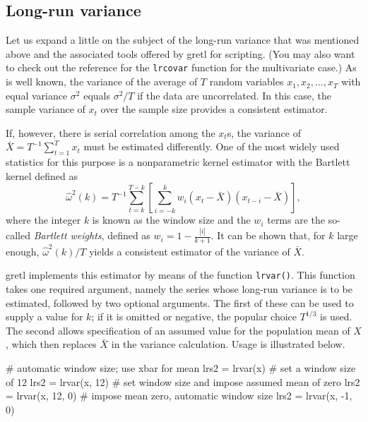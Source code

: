 \subsection{Long-run variance}
\label{sec:lrvar}

Let us expand a little on the subject of the long-run variance that
was mentioned above and the associated tools offered by gretl for
scripting. (You may also want to check out the reference for the
\texttt{lrcovar} function for the multivariate case.)  As is well
known, the variance of the average of $T$ random variables
$x_1, x_2, \ldots, x_T$ with equal variance $\sigma^2$ equals
$\sigma^2/T$ if the data are uncorrelated. In this case, the sample
variance of $x_t$ over the sample size provides a consistent
estimator.

If, however, there is serial correlation among the $x_t$s, the
variance of $\bar{X} = T^{-1} \sum_{t=1}^T x_t$ must be estimated
differently. One of the most widely used statistics for this purpose
is a nonparametric kernel estimator with the Bartlett kernel defined
as
\begin{equation}
  \label{eq:scalar-lrvar}
  \hat{\omega}^2(k) = T^{-1} \sum_{t=k}^{T-k} \left[ \sum_{i=-k}^k w_i (x_t -
  \bar{X}) (x_{t-i} - \bar{X}) \right] ,
\end{equation}
where the integer $k$ is known as the window size and the $w_i$ terms
are the so-called \emph{Bartlett weights}, defined as $w_i = 1 -
\frac{|i|}{k + 1}$. It can be shown that, for $k$ large enough,
$\hat{\omega}^2(k)/T$ yields a consistent estimator of the variance of
$\bar{X}$.

gretl implements this estimator by means of the function
\texttt{lrvar()}. This function takes one required argument, namely
the series whose long-run variance is to be estimated, followed by two
optional arguments. The first of these can be used to supply a value
for $k$; if it is omitted or negative, the popular choice $T^{1/3}$ is
used. The second allows specification of an assumed value for the
population mean of $X$, which then replaces $\bar{X}$ in the variance
calculation. Usage is illustrated below.
\begin{code}
# automatic window size; use xbar for mean
lrs2 = lrvar(x)
# set a window size of 12
lrs2 = lrvar(x, 12)
# set window size and impose assumed mean of zero
lrs2 = lrvar(x, 12, 0)
# impose mean zero, automatic window size
lrs2 = lrvar(x, -1, 0)
\end{code}

